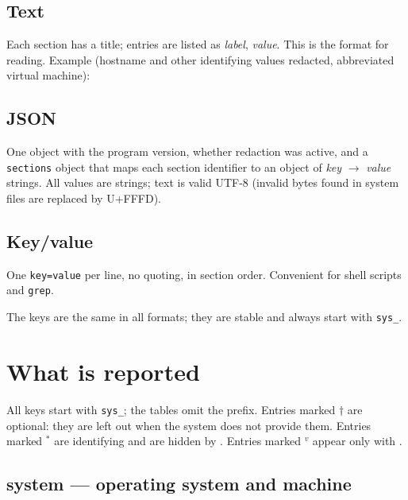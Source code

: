 \documentclass[11pt,a4paper]{article}
\newcommand{\cmd}[1]{\texttt{#1}}
\newcommand{\opt}[1]{\texttt{\detokenize{#1}}}
\begin{document}
\subsection{Text}

Each section has a title; entries are listed as \emph{label}, \emph{value}. This is the format for reading.
Example (hostname and other identifying values redacted, abbreviated virtual machine):



\subsection{JSON}

One object with the program version, whether redaction was active, and a \texttt{sections} object that maps
each section identifier to an object of \emph{key} $\to$ \emph{value} strings. All values are strings; text is valid
UTF-8 (invalid bytes found in system files are replaced by U+FFFD).



\subsection{Key/value}

One \texttt{key=value} per line, no quoting, in section order. Convenient for shell scripts and \cmd{grep}.



The keys are the same in all formats; they are stable and always start with \texttt{sys\_}.

\section{What is reported}
\label{sec:sections}

All keys start with \texttt{sys\_}; the tables omit the prefix. Entries marked $\dagger$ are
optional: they are left out when the system does not provide them. Entries marked $^{*}$ are
identifying and are hidden by \opt{--redact}. Entries marked $^{v}$ appear only with \opt{--verbose}.

\subsection{system \textnormal{--- operating system and machine}}
\end{document}
